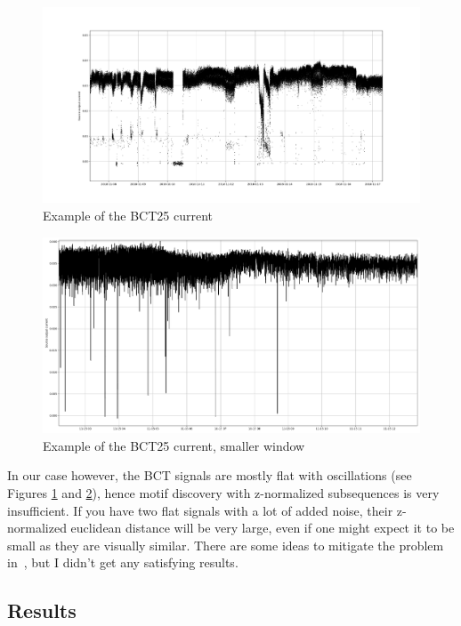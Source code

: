 \documentclass[12pt,a4paper]{article}
\begin{document}
\begin{figure}
\centering
\includegraphics{images/current_demo.png}
\caption{Example of the BCT25 current}
\label{fig:current_demo}
\end{figure}

\begin{figure}
\centering
\includegraphics{images/current_demo_2.png}
\caption{Example of the BCT25 current, smaller window}
\label{fig:current_demo_2}
\end{figure}

In our case however, the BCT signals are mostly flat with oscillations (see Figures \ref{fig:current_demo} and \ref{fig:current_demo_2}), hence motif discovery with z-normalized subsequences is very insufficient. If you have two flat signals with a lot of added noise, their z-normalized euclidean distance will be very large, even if one might expect it to be small as they are visually similar. There are some ideas to mitigate the problem in~\cite{Paepe:EliminatingNoiseMatrix}, but I didn't get any satisfying results.

\hypertarget{results}{%
\subsection{Results}\label{results}}
\end{document}
